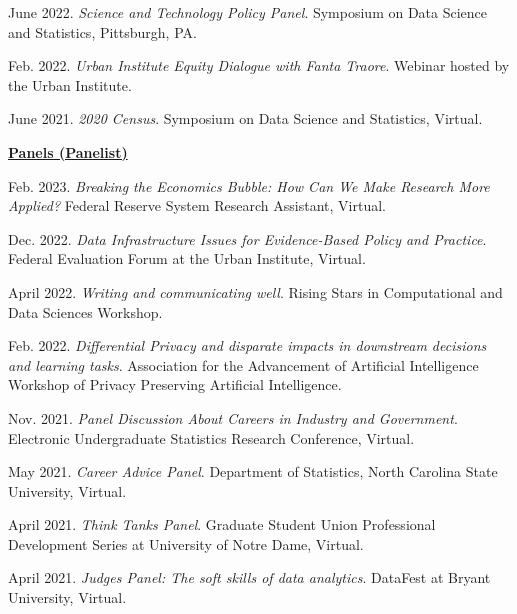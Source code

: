 \begin{etaremune}[topsep=0pt, itemsep=4pt, partopsep=0pt, parsep=0pt]
    \item June 2022. \textit{Science and Technology Policy Panel}. Symposium on Data Science and Statistics, Pittsburgh, PA.
    
    \item Feb. 2022. \textit{Urban Institute Equity Dialogue with Fanta Traore}. Webinar hosted by the Urban Institute.
    
    \item June 2021. \textit{2020 Census}. Symposium on Data Science and Statistics, Virtual.
    
    \vspace{6pt}
\hspace{-0.30in}\underline{\textbf{\large Panels (Panelist)}}\normalsize
    \item Feb. 2023. \textit{Breaking the Economics Bubble: How Can We Make Research More Applied?} Federal Reserve System Research Assistant, Virtual.
    
    \item Dec. 2022. \textit{Data Infrastructure Issues for Evidence-Based Policy and Practice}. Federal Evaluation Forum at the Urban Institute, Virtual.
    
    \item April 2022. \textit{Writing and communicating well}. Rising Stars in Computational and Data Sciences Workshop.

    \item Feb. 2022. \textit{Differential Privacy and disparate impacts in downstream decisions and learning tasks}. Association for the Advancement of Artificial Intelligence Workshop of Privacy Preserving Artificial Intelligence.
    
    \item Nov. 2021. \textit{Panel Discussion About Careers in Industry and Government}. Electronic Undergraduate Statistics Research Conference, Virtual.

    \item May 2021. \textit{Career Advice Panel}. Department of Statistics, North Carolina State University, Virtual.
    
    \item April 2021. \textit{Think Tanks Panel}. Graduate Student Union Professional Development Series at University of Notre Dame, Virtual.
    
    \item April 2021. \textit{Judges Panel: The soft skills of data analytics}. DataFest at Bryant University, Virtual.
\end{etaremune}
